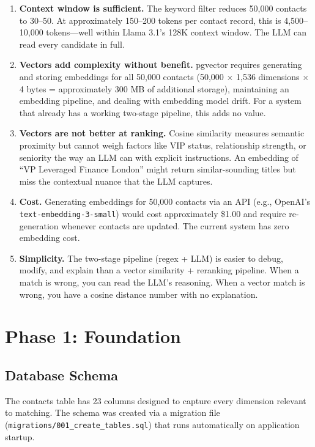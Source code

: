 \documentclass[12pt, a4paper]{report}
\begin{document}
\begin{enumerate}[itemsep=4pt]
    \item \textbf{Context window is sufficient.} The keyword filter reduces 50,000 contacts to 30--50. At approximately 150--200 tokens per contact record, this is 4,500--10,000 tokens---well within Llama 3.1's 128K context window. The LLM can read every candidate in full.
    \item \textbf{Vectors add complexity without benefit.} pgvector requires generating and storing embeddings for all 50,000 contacts (50,000 $\times$ 1,536 dimensions $\times$ 4 bytes = approximately 300 MB of additional storage), maintaining an embedding pipeline, and dealing with embedding model drift. For a system that already has a working two-stage pipeline, this adds no value.
    \item \textbf{Vectors are not better at ranking.} Cosine similarity measures semantic proximity but cannot weigh factors like VIP status, relationship strength, or seniority the way an LLM can with explicit instructions. An embedding of ``VP Leveraged Finance London'' might return similar-sounding titles but miss the contextual nuance that the LLM captures.
    \item \textbf{Cost.} Generating embeddings for 50,000 contacts via an API (e.g., OpenAI's \texttt{text-embedding-3-small}) would cost approximately \$1.00 and require re-generation whenever contacts are updated. The current system has zero embedding cost.
    \item \textbf{Simplicity.} The two-stage pipeline (regex + LLM) is easier to debug, modify, and explain than a vector similarity + reranking pipeline. When a match is wrong, you can read the LLM's reasoning. When a vector match is wrong, you have a cosine distance number with no explanation.
\end{enumerate}

\chapter{Phase 1: Foundation}

\section{Database Schema}

The contacts table has 23 columns designed to capture every dimension relevant to matching. The schema was created via a migration file (\texttt{migrations/001\_create\_tables.sql}) that runs automatically on application startup.
\end{document}
